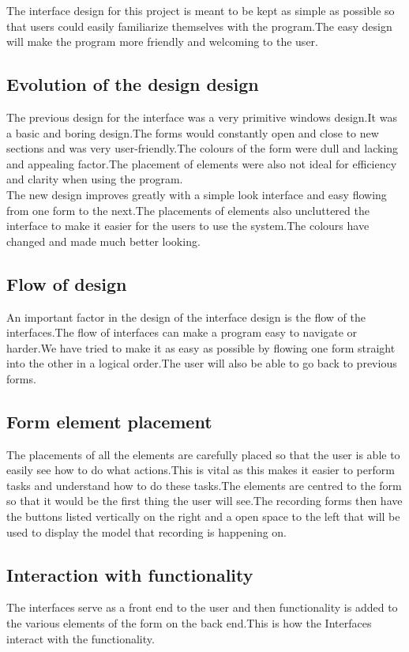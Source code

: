 The interface design for this project is meant to be kept as simple as possible so that users could easily familiarize themselves with the program.The easy design will make the program more friendly and welcoming to the user.

\subsection{Evolution of the design design}
The previous design for the interface was a very primitive windows design.It was a basic and boring design.The forms would constantly open and close to new sections and was very user-friendly.The colours of the form were dull and lacking and appealing factor.The placement of elements were also not ideal for efficiency and clarity when using the program.\\

The new design improves greatly with a simple look interface and easy flowing from one form to the next.The placements of elements also uncluttered the interface to make it easier for the users to use the system.The colours have changed and made much better looking.
\subsection{Flow of design}
An important factor in the design of the interface design is the flow of the interfaces.The flow of interfaces can make a program easy to navigate or harder.We have tried to make it as easy as possible by flowing one form straight into the other in a logical order.The user will also be able to go back to previous forms.
\subsection{Form element placement}
The placements of all the elements are carefully placed so that the user is able to easily see how to do what actions.This is vital as this makes it easier to perform tasks and understand how to do these tasks.The elements are centred to the form so that it would be the first thing the user will see.The recording forms then have the buttons listed vertically on the right and a open space to the left that will be used to display the model that recording is happening on.

\subsection{Interaction with functionality}
The interfaces serve as a front end to the user and then functionality is added to the various elements of the form on the back end.This is how the Interfaces interact with the functionality.